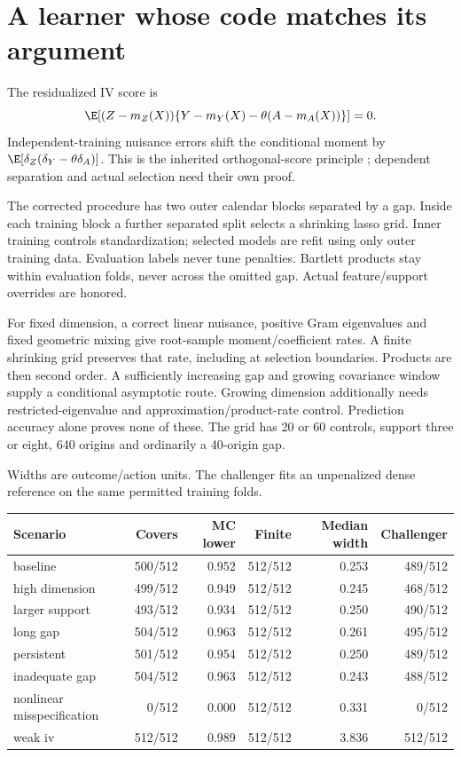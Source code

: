 \section{A learner whose code matches its argument}
The residualized IV score is
\[
 \E[(Z-m_Z(X))\{Y-m_Y(X)-\theta(A-m_A(X))\}]=0.
\]
Independent-training nuisance errors shift the conditional moment by $\E[\delta_Z(\delta_Y-\theta\delta_A)]$. This is the inherited orthogonal-score principle \citep{dml2018}; dependent separation and actual selection need their own proof.

The corrected procedure has two outer calendar blocks separated by a gap. Inside each training block a further separated split selects a shrinking lasso grid. Inner training controls standardization; selected models are refit using only outer training data. Evaluation labels never tune penalties. Bartlett products stay within evaluation folds, never across the omitted gap. Actual feature/support overrides are honored.

For fixed dimension, a correct linear nuisance, positive Gram eigenvalues and fixed geometric mixing give root-sample moment/coefficient rates. A finite shrinking grid preserves that rate, including at selection boundaries. Products are then second order. A sufficiently increasing gap and growing covariance window supply a conditional asymptotic route. Growing dimension additionally needs restricted-eigenvalue and approximation/product-rate control. Prediction accuracy alone proves none of these. The grid has 20 or 60 controls, support three or eight, 640 origins and ordinarily a 40-origin gap.

Widths are outcome/action units. The challenger fits an unpenalized dense reference on the same permitted training folds.

\begin{center}\footnotesize\begin{tabular}{lrrrrr}\toprule
Scenario & Covers & MC lower & Finite & Median width & Challenger\\
\midrule
baseline & 500/512 & 0.952 & 512/512 & 0.253 & 489/512 \\
high dimension & 499/512 & 0.949 & 512/512 & 0.245 & 468/512 \\
larger support & 493/512 & 0.934 & 512/512 & 0.250 & 490/512 \\
long gap & 504/512 & 0.963 & 512/512 & 0.261 & 495/512 \\
persistent & 501/512 & 0.954 & 512/512 & 0.250 & 489/512 \\
inadequate gap & 504/512 & 0.963 & 512/512 & 0.243 & 488/512 \\
nonlinear misspecification & 0/512 & 0.000 & 512/512 & 0.331 & 0/512 \\
weak iv & 512/512 & 0.989 & 512/512 & 3.836 & 512/512 \\
\bottomrule\end{tabular}\end{center}


